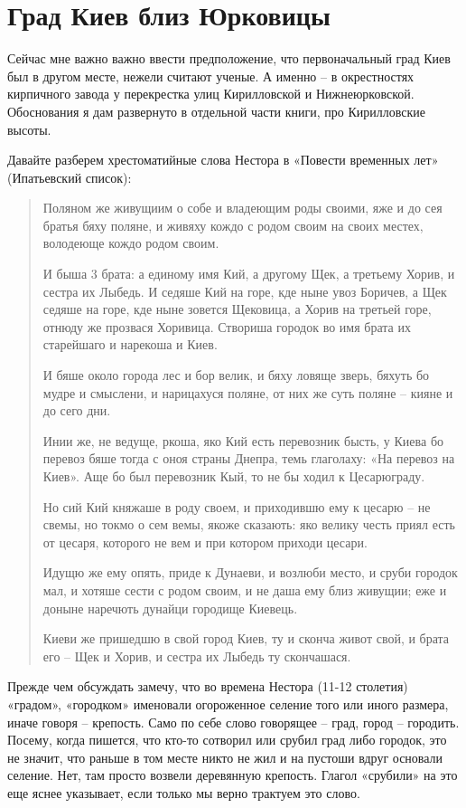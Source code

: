 \chapter{Град Киев близ Юрковицы}

Сейчас мне важно важно ввести предположение,  
 что первоначальный град Киев был в другом месте, нежели считают ученые. А именно – в окрестностях кирпичного завода у перекрестка улиц Кирилловской и Нижнеюрковской. Обоснования я дам развернуто в отдельной части книги, про Кирилловские высоты.

Давайте разберем хрестоматийные слова Нестора в «Повести временных лет» (Ипатьевский список):

\begin{quotation}  
Поляном же живущиим о собе и владеющим роды своими, яже и до сея братья бяху поляне, и живяху кождо с родом своим на своих местех, володеюще кождо родом своим. 

И быша 3 брата: а единому имя Кий, а другому Щек, а третьему Хорив, и сестра их Лыбедь. И седяше Кий на горе, кде ныне увоз Боричев, а Щек седяше на горе, кде ныне зовется Щековица, а Хорив на третьей горе, отнюду же прозвася Хоривица. Створиша городок во имя брата их старейшаго и нарекоша и Киев. 

И бяше около города лес и бор велик, и бяху ловяще зверь, бяхуть бо мудре и смыслени, и нарицахуся поляне, от них же суть поляне – кияне и до сего дни.

Инии же, не ведуще, ркоша, яко Кий есть перевозник бысть, у Киева бо перевоз бяше тогда с оноя страны Днепра, темь глаголаху: «На перевоз на Киев». Аще бо был перевозник Кый, то не бы ходил к Цесарюграду. 

Но сий Кий княжаше в роду своем, и приходившю ему к цесарю – не свемы, но токмо о сем вемы, якоже сказають: яко велику честь приял есть от цесаря, которого не вем и при котором приходи цесари. 

Идущю же ему опять, приде к Дунаеви, и возлюби место, и сруби городок мал, и хотяше сести с родом своим, и не даша ему близ живущии; еже и доныне наречють дунайци городище Киевець. 

Киеви же пришедшю в свой город Киев, ту и сконча живот свой, и брата его – Щек и Хорив, и сестра их Лыбедь ту скончашася.
\end{quotation}  

Прежде чем обсуждать замечу, что во времена Нестора (11-12 столетия) «градом», «городком» именовали огороженное селение того или иного размера, иначе говоря – крепость. Само по себе слово говорящее – град, город – городить. Посему, когда пишется, что кто-то сотворил или срубил град либо городок, это не значит, что раньше в том месте никто не жил и на пустоши вдруг основали селение. Нет, там просто возвели деревянную крепость. Глагол «срубили» на это еще яснее указывает, если только мы верно трактуем это слово.

